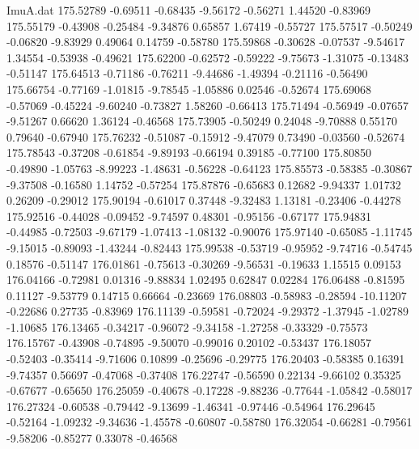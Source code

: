 \begin{filecontents}{ImuA.dat}
 175.52789   -0.69511   -0.68435   -9.56172   -0.56271    1.44520   -0.83969
 175.55179   -0.43908   -0.25484   -9.34876    0.65857    1.67419   -0.55727
 175.57517   -0.50249   -0.06820   -9.83929    0.49064    0.14759   -0.58780
 175.59868   -0.30628   -0.07537   -9.54617    1.34554   -0.53938   -0.49621
 175.62200   -0.62572   -0.59222   -9.75673   -1.31075   -0.13483   -0.51147
 175.64513   -0.71186   -0.76211   -9.44686   -1.49394   -0.21116   -0.56490
 175.66754   -0.77169   -1.01815   -9.78545   -1.05886    0.02546   -0.52674
 175.69068   -0.57069   -0.45224   -9.60240   -0.73827    1.58260   -0.66413
 175.71494   -0.56949   -0.07657   -9.51267    0.66620    1.36124   -0.46568
 175.73905   -0.50249    0.24048   -9.70888    0.55170    0.79640   -0.67940
 175.76232   -0.51087   -0.15912   -9.47079    0.73490   -0.03560   -0.52674
 175.78543   -0.37208   -0.61854   -9.89193   -0.66194    0.39185   -0.77100
 175.80850   -0.49890   -1.05763   -8.99223   -1.48631   -0.56228   -0.64123
 175.85573   -0.58385   -0.30867   -9.37508   -0.16580    1.14752   -0.57254
 175.87876   -0.65683    0.12682   -9.94337    1.01732    0.26209   -0.29012
 175.90194   -0.61017    0.37448   -9.32483    1.13181   -0.23406   -0.44278
 175.92516   -0.44028   -0.09452   -9.74597    0.48301   -0.95156   -0.67177
 175.94831   -0.44985   -0.72503   -9.67179   -1.07413   -1.08132   -0.90076
 175.97140   -0.65085   -1.11745   -9.15015   -0.89093   -1.43244   -0.82443
 175.99538   -0.53719   -0.95952   -9.74716   -0.54745    0.18576   -0.51147
 176.01861   -0.75613   -0.30269   -9.56531   -0.19633    1.15515    0.09153
 176.04166   -0.72981    0.01316   -9.88834    1.02495    0.62847    0.02284
 176.06488   -0.81595    0.11127   -9.53779    0.14715    0.66664   -0.23669
 176.08803   -0.58983   -0.28594  -10.11207   -0.22686    0.27735   -0.83969
 176.11139   -0.59581   -0.72024   -9.29372   -1.37945   -1.02789   -1.10685
 176.13465   -0.34217   -0.96072   -9.34158   -1.27258   -0.33329   -0.75573
 176.15767   -0.43908   -0.74895   -9.50070   -0.99016    0.20102   -0.53437
 176.18057   -0.52403   -0.35414   -9.71606    0.10899   -0.25696   -0.29775
 176.20403   -0.58385    0.16391   -9.74357    0.56697   -0.47068   -0.37408
 176.22747   -0.56590    0.22134   -9.66102    0.35325   -0.67677   -0.65650
 176.25059   -0.40678   -0.17228   -9.88236   -0.77644   -1.05842   -0.58017
 176.27324   -0.60538   -0.79442   -9.13699   -1.46341   -0.97446   -0.54964
 176.29645   -0.52164   -1.09232   -9.34636   -1.45578   -0.60807   -0.58780
 176.32054   -0.66281   -0.79561   -9.58206   -0.85277    0.33078   -0.46568

\end{filecontents}
